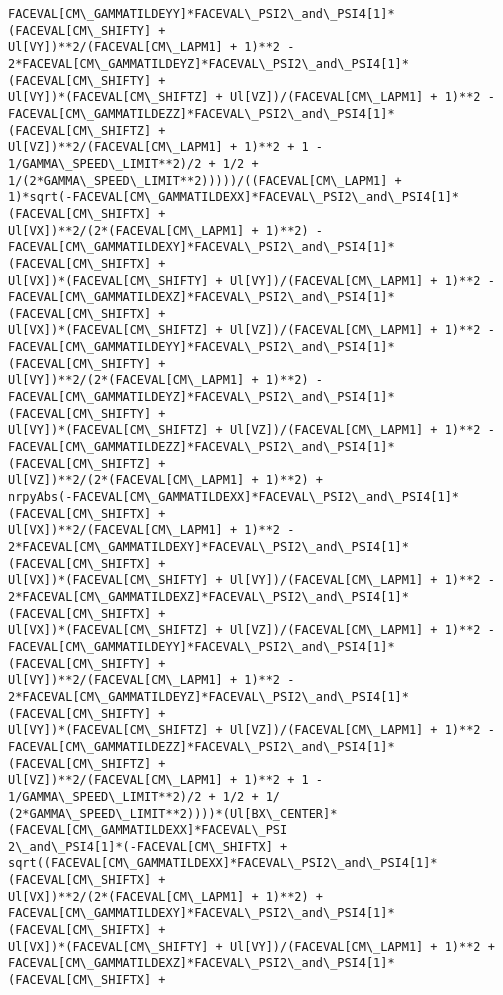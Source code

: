 \documentclass[landscape,letterpaper,10pt,english]{article}
\begin{document}
\begin{Verbatim}[commandchars=\\\{\}]
FACEVAL[CM\_GAMMATILDEYY]*FACEVAL\_PSI2\_and\_PSI4[1]*(FACEVAL[CM\_SHIFTY] +
Ul[VY])**2/(FACEVAL[CM\_LAPM1] + 1)**2 -
2*FACEVAL[CM\_GAMMATILDEYZ]*FACEVAL\_PSI2\_and\_PSI4[1]*(FACEVAL[CM\_SHIFTY] +
Ul[VY])*(FACEVAL[CM\_SHIFTZ] + Ul[VZ])/(FACEVAL[CM\_LAPM1] + 1)**2 -
FACEVAL[CM\_GAMMATILDEZZ]*FACEVAL\_PSI2\_and\_PSI4[1]*(FACEVAL[CM\_SHIFTZ] +
Ul[VZ])**2/(FACEVAL[CM\_LAPM1] + 1)**2 + 1 - 1/GAMMA\_SPEED\_LIMIT**2)/2 + 1/2 +
1/(2*GAMMA\_SPEED\_LIMIT**2)))))/((FACEVAL[CM\_LAPM1] +
1)*sqrt(-FACEVAL[CM\_GAMMATILDEXX]*FACEVAL\_PSI2\_and\_PSI4[1]*(FACEVAL[CM\_SHIFTX] +
Ul[VX])**2/(2*(FACEVAL[CM\_LAPM1] + 1)**2) -
FACEVAL[CM\_GAMMATILDEXY]*FACEVAL\_PSI2\_and\_PSI4[1]*(FACEVAL[CM\_SHIFTX] +
Ul[VX])*(FACEVAL[CM\_SHIFTY] + Ul[VY])/(FACEVAL[CM\_LAPM1] + 1)**2 -
FACEVAL[CM\_GAMMATILDEXZ]*FACEVAL\_PSI2\_and\_PSI4[1]*(FACEVAL[CM\_SHIFTX] +
Ul[VX])*(FACEVAL[CM\_SHIFTZ] + Ul[VZ])/(FACEVAL[CM\_LAPM1] + 1)**2 -
FACEVAL[CM\_GAMMATILDEYY]*FACEVAL\_PSI2\_and\_PSI4[1]*(FACEVAL[CM\_SHIFTY] +
Ul[VY])**2/(2*(FACEVAL[CM\_LAPM1] + 1)**2) -
FACEVAL[CM\_GAMMATILDEYZ]*FACEVAL\_PSI2\_and\_PSI4[1]*(FACEVAL[CM\_SHIFTY] +
Ul[VY])*(FACEVAL[CM\_SHIFTZ] + Ul[VZ])/(FACEVAL[CM\_LAPM1] + 1)**2 -
FACEVAL[CM\_GAMMATILDEZZ]*FACEVAL\_PSI2\_and\_PSI4[1]*(FACEVAL[CM\_SHIFTZ] +
Ul[VZ])**2/(2*(FACEVAL[CM\_LAPM1] + 1)**2) +
nrpyAbs(-FACEVAL[CM\_GAMMATILDEXX]*FACEVAL\_PSI2\_and\_PSI4[1]*(FACEVAL[CM\_SHIFTX] +
Ul[VX])**2/(FACEVAL[CM\_LAPM1] + 1)**2 -
2*FACEVAL[CM\_GAMMATILDEXY]*FACEVAL\_PSI2\_and\_PSI4[1]*(FACEVAL[CM\_SHIFTX] +
Ul[VX])*(FACEVAL[CM\_SHIFTY] + Ul[VY])/(FACEVAL[CM\_LAPM1] + 1)**2 -
2*FACEVAL[CM\_GAMMATILDEXZ]*FACEVAL\_PSI2\_and\_PSI4[1]*(FACEVAL[CM\_SHIFTX] +
Ul[VX])*(FACEVAL[CM\_SHIFTZ] + Ul[VZ])/(FACEVAL[CM\_LAPM1] + 1)**2 -
FACEVAL[CM\_GAMMATILDEYY]*FACEVAL\_PSI2\_and\_PSI4[1]*(FACEVAL[CM\_SHIFTY] +
Ul[VY])**2/(FACEVAL[CM\_LAPM1] + 1)**2 -
2*FACEVAL[CM\_GAMMATILDEYZ]*FACEVAL\_PSI2\_and\_PSI4[1]*(FACEVAL[CM\_SHIFTY] +
Ul[VY])*(FACEVAL[CM\_SHIFTZ] + Ul[VZ])/(FACEVAL[CM\_LAPM1] + 1)**2 -
FACEVAL[CM\_GAMMATILDEZZ]*FACEVAL\_PSI2\_and\_PSI4[1]*(FACEVAL[CM\_SHIFTZ] +
Ul[VZ])**2/(FACEVAL[CM\_LAPM1] + 1)**2 + 1 - 1/GAMMA\_SPEED\_LIMIT**2)/2 + 1/2 + 1/
(2*GAMMA\_SPEED\_LIMIT**2))))*(Ul[BX\_CENTER]*(FACEVAL[CM\_GAMMATILDEXX]*FACEVAL\_PSI
2\_and\_PSI4[1]*(-FACEVAL[CM\_SHIFTX] +
sqrt((FACEVAL[CM\_GAMMATILDEXX]*FACEVAL\_PSI2\_and\_PSI4[1]*(FACEVAL[CM\_SHIFTX] +
Ul[VX])**2/(2*(FACEVAL[CM\_LAPM1] + 1)**2) +
FACEVAL[CM\_GAMMATILDEXY]*FACEVAL\_PSI2\_and\_PSI4[1]*(FACEVAL[CM\_SHIFTX] +
Ul[VX])*(FACEVAL[CM\_SHIFTY] + Ul[VY])/(FACEVAL[CM\_LAPM1] + 1)**2 +
FACEVAL[CM\_GAMMATILDEXZ]*FACEVAL\_PSI2\_and\_PSI4[1]*(FACEVAL[CM\_SHIFTX] +

\end{Verbatim}
\end{document}
